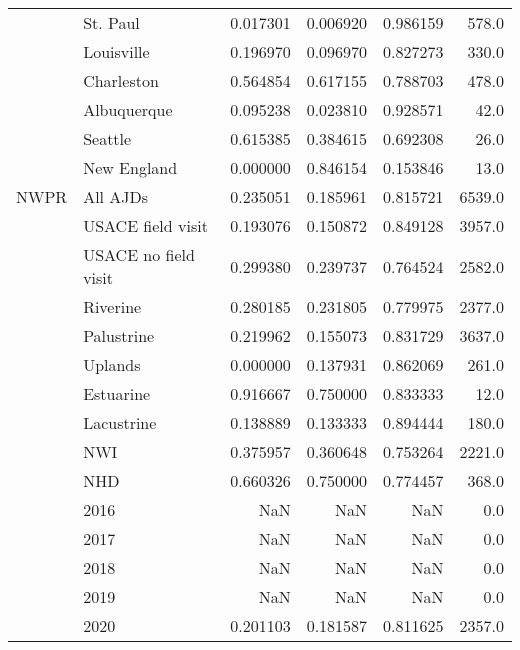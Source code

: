 \begin{tabular}{llrrrr}
     & St. Paul &        0.017301 &               0.006920 &  0.986159 &    578.0 \\
     & Louisville &        0.196970 &               0.096970 &  0.827273 &    330.0 \\
     & Charleston &        0.564854 &               0.617155 &  0.788703 &    478.0 \\
     & Albuquerque &        0.095238 &               0.023810 &  0.928571 &     42.0 \\
     & Seattle &        0.615385 &               0.384615 &  0.692308 &     26.0 \\
     & New England &        0.000000 &               0.846154 &  0.153846 &     13.0 \\
NWPR & All AJDs &        0.235051 &               0.185961 &  0.815721 &   6539.0 \\
     & USACE field visit &        0.193076 &               0.150872 &  0.849128 &   3957.0 \\
     & USACE no field visit &        0.299380 &               0.239737 &  0.764524 &   2582.0 \\
     & Riverine &        0.280185 &               0.231805 &  0.779975 &   2377.0 \\
     & Palustrine &        0.219962 &               0.155073 &  0.831729 &   3637.0 \\
     & Uplands &        0.000000 &               0.137931 &  0.862069 &    261.0 \\
     & Estuarine &        0.916667 &               0.750000 &  0.833333 &     12.0 \\
     & Lacustrine &        0.138889 &               0.133333 &  0.894444 &    180.0 \\
     & NWI &        0.375957 &               0.360648 &  0.753264 &   2221.0 \\
     & NHD &        0.660326 &               0.750000 &  0.774457 &    368.0 \\
     & 2016 &             NaN &                    NaN &       NaN &      0.0 \\
     & 2017 &             NaN &                    NaN &       NaN &      0.0 \\
     & 2018 &             NaN &                    NaN &       NaN &      0.0 \\
     & 2019 &             NaN &                    NaN &       NaN &      0.0 \\
     & 2020 &        0.201103 &               0.181587 &  0.811625 &   2357.0 \\

\end{tabular}
